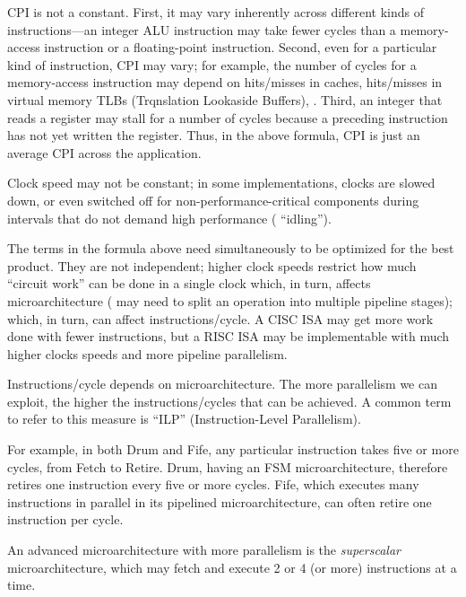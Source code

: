 CPI is not a constant.  First, it may vary inherently across different
kinds of instructions---an integer ALU instruction may take fewer
cycles than a memory-access instruction or a floating-point
instruction.  Second, even for a particular kind of instruction, CPI
may vary; for example, the number of cycles for a memory-access
instruction may depend on hits/misses in caches, hits/misses in
virtual memory TLBs (Trqnslation Lookaside Buffers), {\etc}.  Third,
an integer that reads a register may stall for a number of cycles
because a preceding instruction has not yet written the register.
Thus, in the above formula, CPI is just an average CPI across the
application.

Clock speed may not be constant; in some implementations, clocks are
slowed down, or even switched off for non-performance-critical
components during intervals that do not demand high performance ({\eg}
``idling'').

The terms in the formula above need simultaneously to be optimized for
the best product.  They are not independent; higher clock speeds
restrict how much ``circuit work'' can be done in a single clock
which, in turn, affects microarchitecture ({\eg} may need to split an
operation into multiple pipeline stages); which, in turn, can affect
instructions/cycle.  A CISC ISA may get more work done with fewer
instructions, but a RISC ISA may be implementable with much higher
clocks speeds and more pipeline parallelism.

Instructions/cycle depends on microarchitecture.  The more parallelism
we can exploit, the higher the instructions/cycles that can be
achieved.  A common term to refer to this measure is ``ILP''
(Instruction-Level Parallelism).

For example, in both Drum and Fife, any particular instruction takes
five or more cycles, from Fetch to Retire.  Drum, having an FSM
microarchitecture, therefore retires one instruction every five or
more cycles.  Fife, which executes many instructions in parallel in
its pipelined microarchitecture, can often retire one instruction per
cycle.


An advanced microarchitecture with more parallelism is the
\emph{superscalar} microarchitecture, which may fetch and execute 2 or
4 (or more) instructions at a time.


